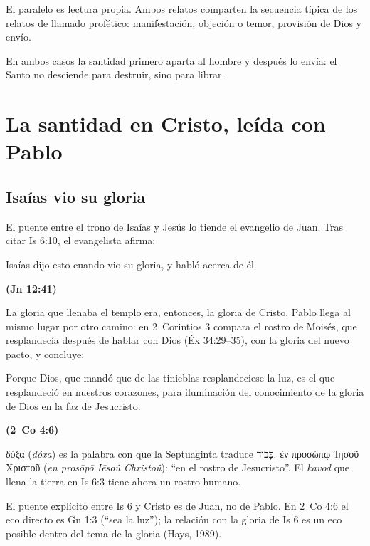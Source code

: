 \documentclass[11pt,letterpaper]{article}
\newcommand{\heb}[1]{\mbox{\foreignlanguage{hebrew}{#1}}}
\newcommand{\grc}[1]{\foreignlanguage{ancientgreek}{#1}}
\newcommand{\fuente}[1]{\par\hfill{\upshape\bfseries\small\textcolor{azul}{#1}}}
\begin{document}
\begin{nota}[Precisión]
El paralelo es lectura propia. Ambos relatos comparten la secuencia típica de los relatos de llamado profético: manifestación, objeción o temor, provisión de Dios y envío.
\end{nota}

En ambos casos la santidad primero aparta al hombre y después lo envía: el Santo no desciende para destruir, sino para librar.

\section{La santidad en Cristo, leída con Pablo}

\subsection{Isaías vio su gloria}
El puente entre el trono de Isaías y Jesús lo tiende el evangelio de Juan. Tras citar Is 6:10, el evangelista afirma:

\begin{cita}Isaías dijo esto cuando vio su gloria, y habló acerca de él.\fuente{(Jn 12:41)}\end{cita}

La gloria que llenaba el templo era, entonces, la gloria de Cristo. Pablo llega al mismo lugar por otro camino: en 2~Corintios 3 compara el rostro de Moisés, que resplandecía después de hablar con Dios (Éx 34:29--35), con la gloria del nuevo pacto, y concluye:

\begin{cita}Porque Dios, que mandó que de las tinieblas resplandeciese la luz, es el que resplandeció en nuestros corazones, para iluminación del conocimiento de la gloria de Dios en la faz de Jesucristo.\fuente{(2~Co 4:6)}\end{cita}

\begin{filologia}[2~Co 4:6]
\grc{δόξα} (\emph{dóxa}) es la palabra con que la Septuaginta traduce \heb{כָּבוֹד}. \grc{ἐν προσώπῳ Ἰησοῦ Χριστοῦ} (\emph{en prosōpō Iēsoû Christoû}): ``en el rostro de Jesucristo''. El \emph{kavod} que llena la tierra en Is 6:3 tiene ahora un rostro humano.
\end{filologia}

\begin{nota}[Precisión]
El puente explícito entre Is 6 y Cristo es de Juan, no de Pablo. En 2~Co 4:6 el eco directo es Gn 1:3 (``sea la luz''); la relación con la gloria de Is 6 es un eco posible dentro del tema de la gloria (Hays, 1989).
\end{nota}
\end{document}
